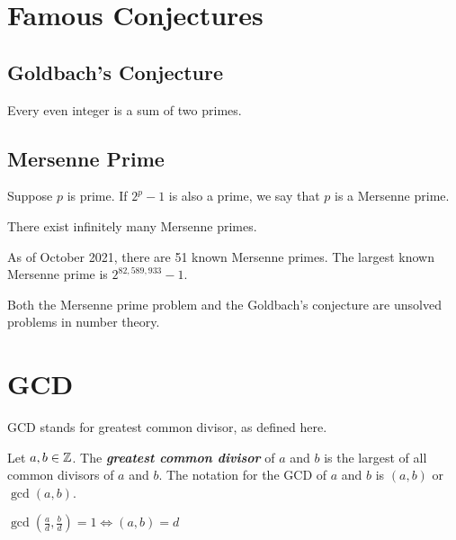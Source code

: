 



\section{Famous Conjectures}
\subsection{Goldbach's Conjecture}

\begin{conjecture}[Goldbach]
    Every even integer is a sum of two primes.
\end{conjecture}

\subsection{Mersenne Prime}

\begin{definition}
    Suppose $p$ is prime. If $2^p - 1$ is also a prime, we say that $p$ is a Mersenne prime.
\end{definition}

\begin{conjecture}
    There exist infinitely many Mersenne primes.
\end{conjecture}

As of October 2021, there are 51 known Mersenne primes. The largest known Mersenne prime is $2^{82,589,933} - 1$.

Both the Mersenne prime problem and the Goldbach's conjecture are unsolved problems in number theory.

\section{GCD}

GCD stands for greatest common divisor, as defined here.

\begin{definition}
    Let $a,b \in \mathbb{Z}$. The \textit{\textbf{greatest common divisor}} of $a$ and $b$ is the largest of all common divisors of $a$ and $b$. The notation for the GCD of $a$ and $b$ is $(a,b)$ or $\gcd(a,b)$.
\end{definition}

\begin{proposition}
    $\gcd(\frac{a}{d}, \frac{b}{d}) = 1 \iff (a,b) = d$ 
\end{proposition}

